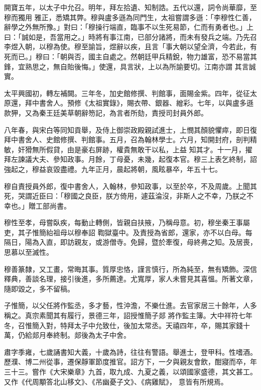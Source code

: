 \begin{pinyinscope}
 開寶五年，以太子中允召。明年，拜左拾遺、知制誥。五代以還，詞令尚華靡，至穆而獨用
 雅正，悉矯其弊。穆與盧多遜為同門生，太祖嘗謂多遜：「李穆性仁善，辭學之外無所豫。」對曰：「穆操行端直，臨事不以生死易節，仁而有勇者也。」上曰：「誠如是，吾當用之。」時將有事江南，已部分諸將，而未有發兵之端。乃先召李煜入朝，以穆為使。穆至諭旨，煜辭以疾，且言「事大朝以望全濟，今若此，有死而已。」穆曰：「朝與否，國主自處之。然朝廷甲兵精銳，物力雄富，恐不易當其鋒，宜熟思之，無自貽後悔。」使還，具言狀，上以為所諭要切。江南亦謂
 其言誠實。



 太平興國初，轉左補闕。三年冬，加史館修撰、判館事，面賜金紫。四年，從征太原還，拜中書舍人。預修《太祖實錄》，賜衣帶、銀器、繒彩。七年，以與盧多遜款狎，又為秦王廷美草朝辭笏記，為言者所劾，責授司封員外郎。



 八年春，與宋白等同知貢舉，及侍上御崇政殿親試進士，上憫其顏貌懼瘁，即日復拜中書舍人、史館修撰、判館事。五月，召為翰林學士。六月，知開封府，剖判精敏，奸猾無所假貸，由是豪右屏跡，權貴無敢干以私，上益
 知其才。十一月，擢拜左諫議大夫、參知政事。月餘，丁母憂，未幾，起復本官。穆三上表乞終制，詔強起之，穆益哀毀盡禮。九年正月，晨起將朝，風眩暴卒，年五十七。



 穆自責授員外郎，復中書舍人，入翰林，參知政事，以至於卒，不及周歲。上聞其死，哭謂近臣曰：「穆國之良臣，朕方倚用，遽茲淪沒，非斯人之不幸，乃朕之不幸也。」贈工部尚書。



 穆性至孝，母嘗臥疾，每動止轉側，皆親自扶掖，乃稱母意。初，穆坐秦王事屬吏，其子惟簡紿祖母以穆奉詔
 鞫獄臺中。及責授為省郎，還家，亦不以白母。每隔日，陽為入直，即訪親友，或游僧寺。免歸，暨於牽復，母終弗之知。及居喪，思慕以至滅性。



 穆善篆隸，又工畫，常晦其事。質厚忠恪，謹言慎行，所為純至，無有矯飾。深信釋典，善談名理，接引後進，多所薦達。尤寬厚，家人未嘗見其喜慍。所著文章，隨即毀之，多不留稿。



 子惟簡，以父任將作監丞，多才藝，性沖澹，不樂仕進。去官家居三十餘年，人多稱之。真宗素聞其有履行，景德三年，詔授惟簡子郯
 將作監主簿。大中祥符七年冬，召惟簡入對，特拜太子中允致仕，後加太常丞。天禧四年，卒，賜其家錢十萬，仍給郯月奉終制。郯後為太子中舍。



 肅字季雍，七歲誦書知大義，十歲為詩，往往有警語。舉進士，登甲科。性嗜酒。歷濮、博二州從事，遷保靜軍節度推官。詔方下，一夕與親友會飲，酣寢而卒，年三十三。嘗作《大宋樂章》九首，取九成、九夏之義，以頌國家盛德，其文甚工。又作《代周顒答北山移文》、《吊幽憂子文》、《病雞賦》，
 意皆有所規焉。




\end{pinyinscope}
